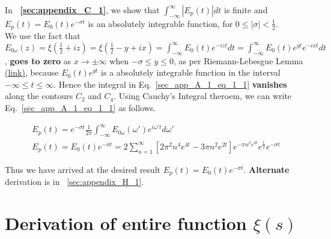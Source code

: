 \documentclass[11pt]{elsarticle}
\begin{document}
In \textbf{~\ref{sec:appendix_C_1}}, we show that $\int_{-\infty}^{\infty} |E_p(t)| dt$ is finite and $E_p(t)= E_0(t) e^{-\sigma t} $ is an  absolutely integrable function, for $0 \leq |\sigma| < \frac{1}{2}$.\\

We use the fact that $E_{0\omega}(z) = \xi(\frac{1}{2}+ i z) = \xi(\frac{1}{2} -y + i x) =  \int_{-\infty}^{\infty} E_0(t) e^{-i z t} dt  =  \int_{-\infty}^{\infty} E_0(t) e^{y t} e^{-i x t} dt $, \textbf{goes to zero} as $x \to \pm \infty$ when $-\sigma \leq y \leq 0$, as per Riemann-Lebesgue Lemma \href{https://en.wikipedia.org/wiki/Riemann%E2%80%93Lebesgue_lemma}{(link)}, because $E_0(t) e^{y t}$ is a absolutely integrable function  in the interval $-\infty \leq t \leq \infty$. Hence the integral in Eq.~\ref{sec_app_A_1_eq_1_1} \textbf{vanishes }along  the contours $C_2$ and $C_4$. Using Cauchy's Integral theroem, we can write Eq.~\ref{sec_app_A_1_eq_1_1} as follows.

\begin{eqnarray*}\label{sec_app_A_1_eq_2}
E_{p}(t) =    e^{-\sigma t}  \frac{1}{2 \pi} \int_{-\infty}^{\infty} E_{0\omega}(\omega') e^{i\omega' t} d\omega' \\
E_{p}(t) =    E_{0}(t) e^{-\sigma t} = 2 \sum_{n=1}^{\infty}  [ 2 \pi^{2} n^{4} e^{4t}    - 3 \pi n^{2}   e^{2t} ]  e^{- \pi n^{2} e^{2t}} e^{\frac{t}{2}} e^{-\sigma t} 
\end{eqnarray*}
\begin{equation} \end{equation}

Thus we have arrived at the desired result $E_{p}(t) =   E_{0}(t) e^{-\sigma t}$. \textbf{Alternate} derivation is in ~\ref{sec:appendix_H_1}.









\section{\label{sec:appendix_H} \textbf{Derivation of entire function $\xi(s)$ } \protect\\  \lowercase{} }


\end{document}
